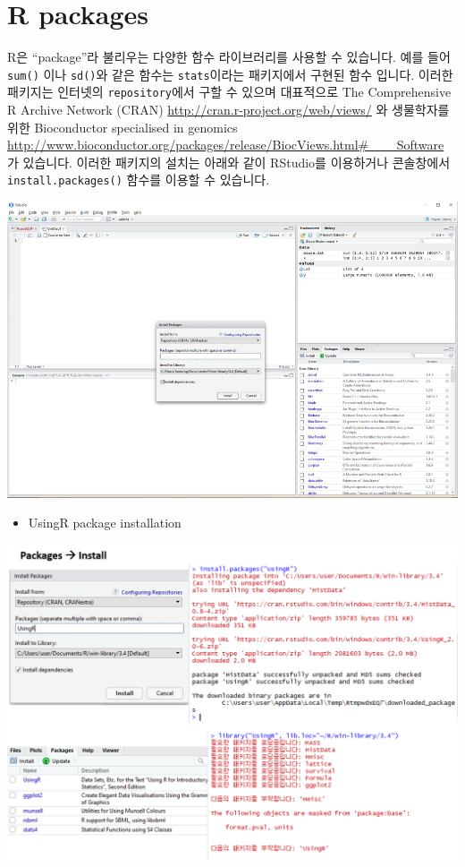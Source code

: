 \documentclass[
]{book}
\providecommand{\tightlist}{%
  \setlength{\itemsep}{0pt}\setlength{\parskip}{0pt}}
\begin{document}
\hypertarget{r-packages}{%
\section{R packages}\label{r-packages}}

R은 ``package''라 불리우는 다양한 함수 라이브러리를 사용할 수 있습니다. 예를 들어 \texttt{sum()} 이나 \texttt{sd()}와 같은 함수는 \texttt{stats}이라는 패키지에서 구현된 함수 입니다. 이러한 패키지는 인터넷의 \texttt{repository}에서 구할 수 있으며 대표적으로 The Comprehensive R Archive Network (CRAN) \url{http://cran.r-project.org/web/views/} 와 생물학자를 위한 Bioconductor specialised in genomics \url{http://www.bioconductor.org/packages/release/BiocViews.html\#___Software} 가 있습니다. 이러한 패키지의 설치는 아래와 같이 RStudio를 이용하거나 콘솔창에서 \texttt{install.packages()} 함수를 이용할 수 있습니다.

\includegraphics{images/01/01-18.png}

\begin{itemize}
\tightlist
\item
  UsingR package installation
\end{itemize}

\includegraphics{images/01/01-19.png}
\end{document}
